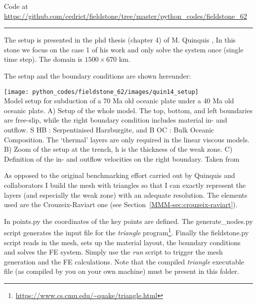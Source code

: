 

\begin{center}
Code at \url{https://github.com/cedrict/fieldstone/tree/master/python_codes/fieldstone_62}
\end{center}

\par\noindent\rule{\textwidth}{0.4pt}

The setup is presented in the phd thesis (chapter 4) of M. Quinquis \cite{quin14},
In this stone we focus on the case 1 of his work and only solve the system once (single time step).
The domain is $1500\times 670$ km. 

The setup and the boundary conditions are shown hereunder:
\begin{center}
\texttt{[image: python\_codes/fieldstone\_62/images/quin14\_setup]}\\
{\captionfont Model setup for subduction of a 70 Ma old oceanic plate under a 40 Ma
old oceanic plate. A) Setup of the whole model. The top, bottom, and left boundaries
are free-slip, while the right boundary condition includes material in- and outflow. S HB :
Serpentinised Harzburgite, and B OC : Bulk Oceanic Composition. The ‘thermal’ layers
are only required in the linear viscous models. B) Zoom of the setup at the trench, h is the
thickness of the weak zone. C) Definition of the in- and outflow velocities on the right
boundary. Taken from \cite{quin14}}
\end{center}

As opposed to the original benchmarking effort carried out by Quinquis and collaborators
I build the mesh with triangles so that I can exactly represent the layers (and especially 
the weak zone) with an adequate resolution. The elements used are the Crouzeix-Raviart one
(see Section~\ref{MMM-sec:crouzeix-raviart}). 

In {points.py} the coordinates of the key points are defined. The {generate\_nodes.py}
script generates the input file for 
the {\sl triangle} program\footnote{\url{https://www.cs.cmu.edu/~quake/triangle.html}}. 
Finally the {fieldstone.py} script 
reads in the mesh, sets up the material layout, the boundary conditions and solves the 
FE system. Simply use the {\sl run} script to trigger the mesh generation and the FE 
calculations.  
Note that the compiled {\sl triangle} executable file (as compiled by you 
on your own machine) must be present in this folder.

